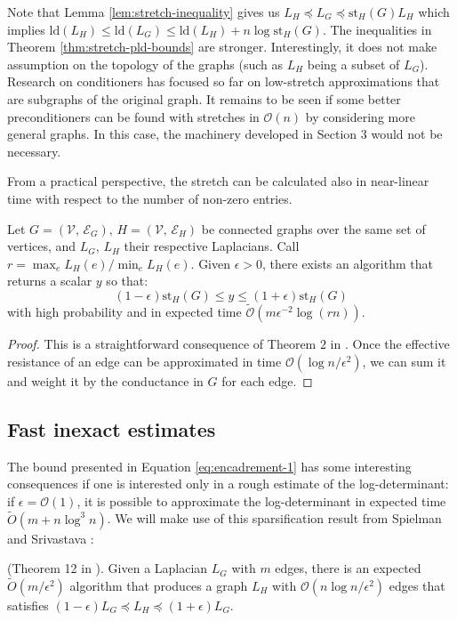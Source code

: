 Note that Lemma \ref{lem:stretch-inequality} gives us $L_{H}\preceq L_{G}\preceq\text{st}_{H}\left(G\right)L_{H}$
which implies $\text{ld}\left(L_{H}\right)\leq\text{ld}\left(L_{G}\right)\leq\text{ld}\left(L_{H}\right)+n\log\text{st}_{H}\left(G\right)$.
The inequalities in Theorem \ref{thm:stretch-pld-bounds} are stronger.
Interestingly, it does not make assumption on the topology of the
graphs (such as $L_{H}$ being a subset of $L_{G}$). Research on
conditioners has focused so far on low-stretch approximations that
are subgraphs of the original graph. It remains to be seen if some
better preconditioners can be found with stretches in $\mathcal{O}\left(n\right)$
by considering more general graphs. In this case, the machinery developed
in Section 3 would not be necessary.

From a practical perspective, the stretch can be calculated also in near-linear time with
respect to the number of non-zero entries. 
\begin{lemma}
\label{lem:stretch-approx}Let $G=\left(\mathcal{V},\,\mathcal{E}_{G}\right),\, H=\left(\mathcal{V},\,\mathcal{E}_{H}\right)$
be connected graphs over the same set of vertices, and $L_{G}$, $L_{H}$
their respective Laplacians. Call $r=\max_{e}L_{H}\left(e\right)/\min_{e}L_{H}\left(e\right)$.
Given $\epsilon>0$, there exists an algorithm that returns a scalar
$y$ so that: 
\[
\left(1-\epsilon\right)\text{st}_{H}\left(G\right)\leq y\leq\left(1+\epsilon\right)\text{st}_{H}\left(G\right)
\]
with high probability and in expected time $\tilde{\mathcal{O}}\left(m\epsilon^{-2}\log\left(rn\right)\right)$.\end{lemma}
\begin{proof}
This is a straightforward consequence of Theorem $2$ in \cite{Spielman2009}.
Once the effective resistance of an edge can be approximated in time
$\mathcal{O}\left(\log n/\epsilon^{2}\right)$, we can sum it and
weight it by the conductance in $G$ for each edge. 
\end{proof}

\subsection{Fast inexact estimates}

The bound presented in Equation \ref{eq:encadrement-1} has some interesting
consequences if one is interested only in a rough estimate of the
log-determinant: if $\epsilon=\mathcal{O}\left(1\right)$, it is possible
to approximate the log-determinant in expected time $\tilde{O}\left(m+n\log^{3}n\right)$.
We will make use of this sparsification result from Spielman and Srivastava
\cite{Spielman2009}: 
\begin{lemma}
\label{lem:sriva-sparsification}(Theorem 12 in \cite{Spielman2009}).
Given a Laplacian $L_{G}$ with $m$ edges, there is an expected $\tilde{O}\left(m/\epsilon^{2}\right)$
algorithm that produces a graph $L_{H}$ with $\mathcal{O}\left(n\log n/\epsilon^{2}\right)$
edges that satisfies $\left(1-\epsilon\right)L_{G}\preceq L_{H}\preceq\left(1+\epsilon\right)L_{G}$. 
\end{lemma}


